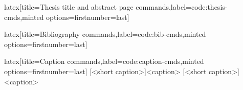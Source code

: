 \begin{code}{latex}[title={Thesis title and abstract page commands},label=code:thesis-cmds,minted options={firstnumber=last}]
\maketitle[thesis]
\end{code}
%
\begin{code}{latex}[title={Bibliography commands},label=code:bib-cmds,minted options={firstnumber=last}]
\makebibliography[<options>]
\end{code}
%
\begin{code}{latex}[title={Caption commands},label=code:caption-cmds,minted options={firstnumber=last}]
[<short caption>]{<caption>}
[<short caption>]{<caption>}
\end{code}
